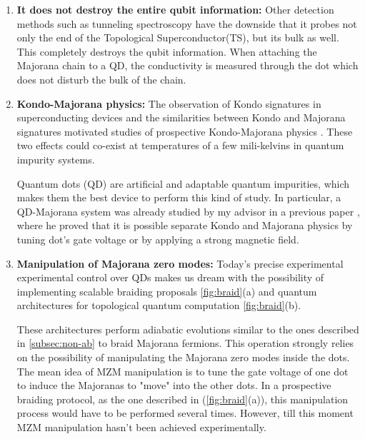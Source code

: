 \begin{enumerate}
  \item \textbf{It does not destroy the entire qubit information:} Other detection methods such as tunneling spectroscopy have the downside that it probes not only the end of the Topological Superconductor(TS), but its bulk as well. This completely destroys the qubit information. When attaching the Majorana chain to a QD, the conductivity is measured through the dot which does not disturb the bulk of the chain. 
  \item \textbf{Kondo-Majorana physics:} The observation of Kondo signatures in superconducting devices \cite{lee_zero-bias_2012} and the similarities between Kondo and Majorana signatures \cite{vernek_subtle_2014}  motivated  studies of prospective Kondo-Majorana physics \cite{lee_kondo_2013,gorski_interplay_2018}. 
  These two effects could co-exist at temperatures of a few mili-kelvins in quantum impurity systems.

   Quantum dots (QD) are artificial and adaptable quantum impurities, which makes them the best device to perform this kind of study. In particular, a QD-Majorana system was already studied by my advisor in a previous paper \citep{ruiz-tijerina_interaction_2015}, where he proved that it is possible separate Kondo and Majorana physics by tuning dot's gate voltage or by applying a strong magnetic field. 
  \item \textbf{Manipulation of Majorana zero modes:} Today's precise experimental experimental control over QDs makes us dream with the possibility of implementing scalable braiding proposals \ref{fig:braid}(a) and  quantum architectures for topological quantum computation \ref{fig:braid}(b). 

    These architectures perform adiabatic evolutions similar to the ones described in  \ref{subsec:non-ab} to braid Majorana fermions. This operation strongly relies on the possibility of manipulating the Majorana zero modes inside the dots. The mean idea of MZM manipulation is to  tune the gate voltage of one dot to induce the Majoranas to "move" into the other dots.  In a prospective braiding protocol, as the one described in  \cite{malciu_braiding_2018} (\ref{fig:braid}(a)), this manipulation process would have to be performed several times. However, till this moment MZM manipulation hasn't been achieved experimentally. 

\end{enumerate}

